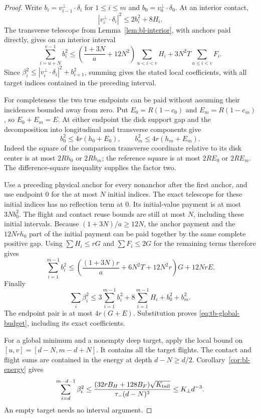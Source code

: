 \begin{proof}
Write $b_i=v_{i-1}^\perp\cdot\delta_i$ for $1\le i\le m$
and $b_0=v_0^\perp\cdot\delta_0$.  At an interior contact,
\[
 |v_i^\perp\cdot\delta_i|^2
 \le2b_i^2+8H_i.
\]
The transverse telescope from Lemma~\ref{lem:bl-interior}, with
anchors paid directly, gives on an interior interval
\[
 \sum_{i=u+N}^{v-1}b_i^2
 \le\left(\frac{1+3N}{a}+12N^2\right)\sum_{u<i<v}H_i
                         +3N^2T\sum_{u\le i<v}F_i.
\]
Since $\beta_i^2\le|v_i^\perp\cdot\delta_i|^2+b_{i+1}^2$,
summing gives the stated local coefficients, with all target
indices contained in the preceding interval.

For completeness the two true endpoints can be paid without
assuming their incidences bounded away from zero.  Put
$E_0=R(1-c_0)$ and $E_m=R(1-c_m)$, so $E_0+E_m=E$.
At either endpoint the disk support gap and the decomposition into
longitudinal and transverse components give
\[
 b_0^2\le4r(h_0+E_0),\qquad
 b_m^2\le4r(h_m+E_m).
\]
Indeed the square of the comparison transverse coordinate relative
to its disk center is at most $2Rh_0$ or $2Rh_m$; the reference
square is at most $2RE_0$ or $2RE_m$.  The difference-square
inequality supplies the factor two.

Use a preceding physical anchor for every nonanchor after the first
anchor, and use endpoint $0$ for the at most $N$ initial indices.
The exact telescope for these initial indices has no reflection
term at $0$.  Its initial-value payment is at most $3Nb_0^2$.
The flight and contact reuse bounds are still at most $N$, including
these initial intervals.  Because $(1+3N)/a\ge12N$, the anchor
payment and the $12Nrh_0$ part of the initial payment can be paid
together by the same complete positive gap.  Using
$\sum H_i\le rG$ and $\sum F_i\le2G$ for the remaining terms
therefore gives
\[
 \sum_{i=1}^{m-1}b_i^2
 \le\left(\frac{(1+3N)r}{a}+6N^2T+12N^2r\right)G
                                      +12NrE.
\]
Finally
\[
 \sum_i\beta_i^2
 \le3\sum_{i=1}^{m-1}b_i^2+8\sum_{i=1}^{m-1}H_i+b_0^2+b_m^2.
\]
The endpoint pair is at most $4r(G+E)$.  Substitution proves
\eqref{eq:tb-global-budget}, including its exact coefficients.

For a global minimum and a nonempty deep target, apply the local
bound on $[u,v]=[d-N,m-d+N]$.  It contains all the target flights.
The contact and flight sums are contained in the energy at depth
$d-N\ge d/2$.  Corollary~\ref{cor:bl-energy} gives
\[
 \sum_{i=d}^{m-d-1}\beta_i^2
 \le\frac{(32rB_H+128B_F)\sqrt{K_{\rm tail}}}
                       {\tau_-(d-N)^3}
 \le K_\perp d^{-3}.
\]
An empty target needs no interval argument.
\end{proof}

